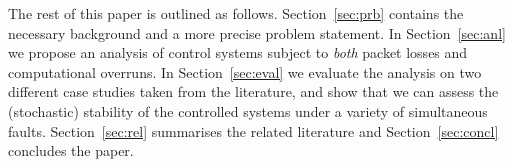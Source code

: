 The rest of this paper is outlined as follows.
Section~\ref{sec:prb} contains the necessary background and a more precise problem statement.
In Section~\ref{sec:anl} we propose an analysis of control systems subject to \emph{both} packet losses and computational overruns.
In Section~\ref{sec:eval} we evaluate the analysis on two different case studies taken from the literature, and show that we can assess the (stochastic) stability of the controlled systems under a variety of simultaneous faults.
Section~\ref{sec:rel} summarises the related literature and Section~\ref{sec:concl} concludes the paper.
